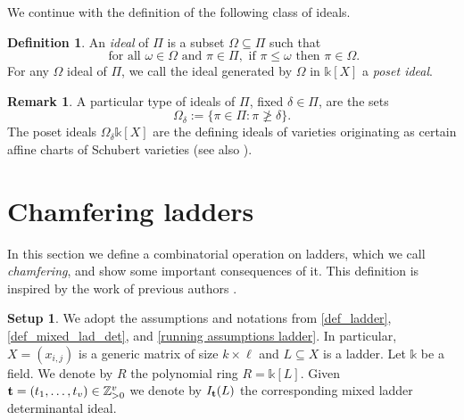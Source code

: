 \documentclass[12pt]{amsart}
\renewcommand{\leq}{\leqslant}
\theoremstyle{definition}
\newtheorem{definition}[definition]{Definition}
\newtheorem{example}[example]{Example}
\newtheorem{remark}[remark]{Remark}
\newtheorem{setup}[setup]{Setup}
\renewcommand{\(}{\left(}
\renewcommand{\)}{\right)}
\newcommand{\ZZ}{\mathbb{Z}}
\newcommand{\kk}{\mathbb{k}}
\renewcommand{\!}[1]{{\color{red}\text{\Huge$\star$ }#1}}
\newcommand{\gs}{\geqslant}
\newcommand{\ttt}{{\bf t}}
\begin{document}

We continue with the definition of the following class of ideals.
\begin{definition}
	An {\it  ideal} of $\Pi$ is a subset $\Omega\subseteq \Pi$ such that $$\text{ for all } \omega\in \Omega \text{ and } \pi\in\Pi, \text{  if } \pi\leq \omega \text{ then } \pi\in\Omega.$$  
For any $\Omega$ ideal of $\Pi$, we call the ideal generated by $\Omega$ in $\kk[X]$  a {\it poset ideal}.
\end{definition}

%

\begin{remark}
A particular type of  ideals of $\Pi$, fixed $\delta\in\Pi$,  are the sets $$\Omega_\delta:=\{\pi\in\Pi: \pi\not\gs \delta\}.$$
The poset ideals $\Omega_\delta\kk[X]$ are %
the defining ideals of %
varieties %
originating as certain affine charts of Schubert varieties  \cite[p. 535]{procesi2007lie} (see also \cite[Chapter 5, \S A]{BookDet}).
\end{remark}



\section{Chamfering ladders}\label{Decorn_Section}
	
In this section we define a combinatorial operation on ladders, which we call  {\it chamfering}, and show some important consequences of it. This definition is inspired by the work of previous authors \cite{conca1995ladder, concaherzog1997, GorlaMixed}.

\begin{setup} \label{setup_chamfer} 
	We adopt the assumptions and notations from \autoref{def_ladder}, \autoref{def_mixed_lad_det}, and \autoref{running assumptions ladder}. %
	In particular, $X=(x_{i,j})$ is a generic matrix of size $k \times \ell$ and $L\subseteq	 X$ is a ladder. Let $\kk$ be a field. We denote by $R$ the polynomial ring $R=\kk[L]$. Given   $\ttt=(t_1,\ldots,t_v) \in \ZZ_{>0}^v$ we denote by $I_\ttt(L)$ the corresponding mixed ladder determinantal ideal.    
\end{setup}
\end{document}

